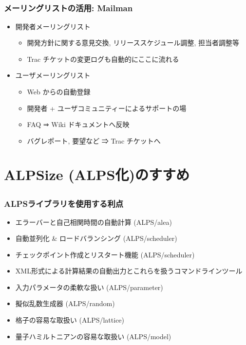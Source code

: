 \subsection*{\redm\whitem\greenb}
\begin{frame}
  \frametitle{メーリングリストの活用: Mailman}
  \begin{itemize}
    \setlength{\itemsep}{1em}
  \item 開発者メーリングリスト
    \begin{itemize}
    \item 開発方針に関する意見交換, リリーススケジュール調整, 担当者調整等
    \item Trac チケットの変更ログも自動的にここに流れる
    \end{itemize}
  \item ユーザメーリングリスト
    \begin{itemize}
    \item Web からの自動登録
    \item 開発者 + ユーザコミュニティーによるサポートの場
    \item FAQ ⇒ Wiki ドキュメントへ反映
    \item バグレポート, 要望など ⇒ Trac チケットへ
    \end{itemize}
  \end{itemize}
\end{frame}

\section{ALPSize (ALPS化)のすすめ}

\subsection*{\redm\whitem\greenb}
\begin{frame}
  \frametitle{ALPSライブラリを使用する利点}
  \begin{itemize}
  \item エラーバーと自己相関時間の自動計算 (ALPS/alea)
  \item 自動並列化 \& ロードバランシング (ALPS/scheduler)
  \item チェックポイント作成とリスタート機能 (ALPS/scheduler)
  \item XML形式による計算結果の自動出力とこれらを扱うコマンドラインツール
  \item 入力パラメータの柔軟な扱い (ALPS/parameter)
  \item 擬似乱数生成器 (ALPS/random)
  \item 格子の容易な取扱い (ALPS/lattice)
  \item 量子ハミルトニアンの容易な取扱い (ALPS/model)
  \end{itemize}
\end{frame}

